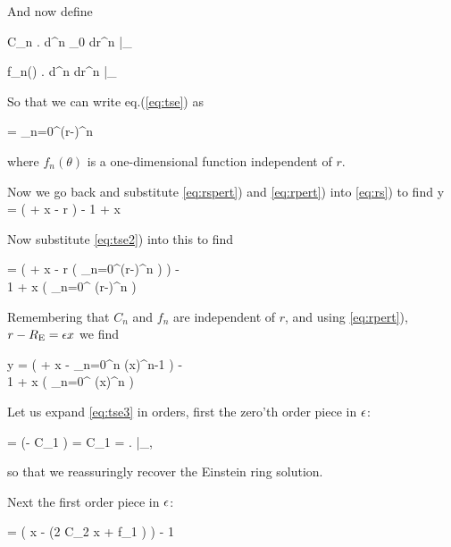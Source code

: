 And now define

\beq
\label{eq:Cndef}
C_n  \left. {d^n \phi_0 \over dr^n }\right|_{\re}
\eeq

\beq
\label{eq:fndef}
f_n(\theta)  \left. {d^n \psi \over dr^n }\right|_{\re}
\eeq

So that we can write  eq.(\ref{eq:tse}) as

\beq
\label{eq:tse2}
\phi  = \sum_{n=0}^\infty {} (r-\re)^n
\eeq

where $f_n(\theta)$ is a one-dimensional function independent of $r$.


Now we go back and substitute \eqref{eq:rspert}) and \eqref{eq:rpert}) into
\eqref{eq:rs}) to find
\beq
\eps y = \left( \re + \eps x -  {\prtl  \phi \over \prtl r} \right)  - {1
\over \re + \eps x}  {\prtl  \phi \over \prtl \theta} \hat{\theta}
\eeq

Now substitute \eqref{eq:tse2}) into this to find

\bea
\eps {} = \left( \re + \eps x -  {\prtl \over \prtl r} \left(
\sum_{n=0}^\infty {} (r-\re)^n  \right) \right)
 - \\
{1 \over \re + \eps x}  {\prtl  \over \prtl \theta} \left( \sum_{n=0}^\infty
{} (r-\re)^n  \right)  \hat{\theta} \nonumber
\eea

Remembering that $C_n$ and  $f_n$ are independent of $r$, and using
\eqref{eq:rpert}), $r-R_{\mathrm{E}} = \epsilon x$ we find

\bea
\label{eq:tse3}
\eps y = \left( \re + \eps x -   \sum_{n=0}^\infty {} n (\eps x)^{n-1}  \right)  - \\
{1 \over \re + \eps x}  {\prtl  \over \prtl \theta} \left( \sum_{n=0}^\infty
{} (\eps x)^n  \right)  \hat{\theta} \nonumber
\eea

Let us expand \eqref{eq:tse3} in orders, first the zero'th order piece in
$\epsilon$:

 =  \left(\re - C_1 \right)  \rightarrow \re = C_1 = \left. \prtl \phi
\over \prtl \theta \right|_{\re},
\eeq

so that we reassuringly recover the Einstein ring solution.

Next the first order piece in $\epsilon$:

\beq
\eps {} = \left( \eps x - (2 C_2 \eps x + \eps f_1 ) \right)  - {1
\over \re}  \hat{\theta}
\eeq

